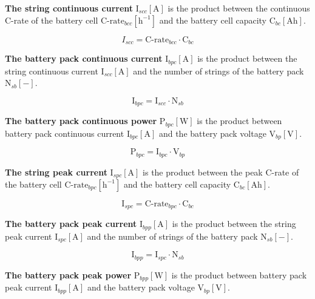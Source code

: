 \textbf{The string continuous current} $\text{I}_{scc} [\text{A}]$ is the product between the continuous C-rate of the battery cell $\text{C-rate}_{bcc} [\text{h}^{-1}]$ and the battery cell capacity $\text{C}_{bc} [\text{Ah}]$.

\begin{equation}\label{eq:Iscc}
{I}_{scc} = \text{C-rate}_{bcc} \cdot \text{C}_{bc}
\end{equation}

\textbf{The battery pack continuous current} $\text{I}_{bpc} [\text{A}]$ is the product between the string continuous current $\text{I}_{scc} [\text{A}]$ and the number of strings of the battery pack $\text{N}_{sb} [-]$.

\begin{equation}\label{eq:Ibpc}
\text{I}_{bpc} = \text{I}_{scc} \cdot \text{N}_{sb}
\end{equation}


\textbf{The battery pack continuous power} $\text{P}_{bpc} [\text{W}]$ is the product between battery pack continuous current $\text{I}_{bpc} [\text{A}]$ and the battery pack voltage $\text{V}_{bp} [\text{V}]$.

\begin{equation}\label{eq:Pbpc}
\text{P}_{bpc} = \text{I}_{bpc} \cdot \text{V}_{bp}
\end{equation}

\textbf{The string peak current} $\text{I}_{spc} [\text{A}]$ is the product between the peak C-rate of the battery cell $\text{C-rate}_{bpc} [\text{h}^{-1}]$ and the battery cell capacity $\text{C}_{bc} [\text{Ah}]$.

\begin{equation}\label{eq:Ispc}
\text{I}_{spc} = \text{C-rate}_{bpc} \cdot \text{C}_{bc}
\end{equation}

\textbf{The battery pack peak current} $\text{I}_{bpp} [\text{A}]$ is the product between the string peak current $\text{I}_{spc} [\text{A}]$ and the number of strings of the battery pack $\text{N}_{sb} [-]$.

\begin{equation}\label{eq:Ibpp}
\text{I}_{bpp} = \text{I}_{spc} \cdot \text{N}_{sb}
\end{equation}

\textbf{The battery pack peak power} $\text{P}_{bpp} [\text{W}]$ is the product between battery pack peak current $\text{I}_{bpp} [\text{A}]$ and the battery pack voltage $\text{V}_{bp} [\text{V}]$.

